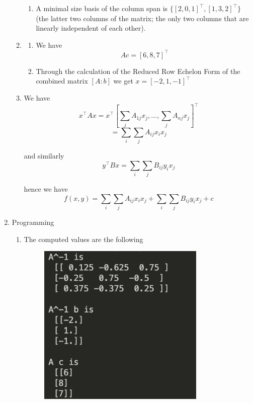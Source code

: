 \documentclass[submit]{harvardml}
\begin{document}
\begin{enumerate}
\begin{enumerate}
\begin{enumerate}
    \item
    A minimal size basis of the column span is $\{[2,0,1]^\top, [1,3,2]^\top\}$ (the latter two 
    columns of the matrix; the only two columns that are linearly independent of each other).  
  \end{enumerate}

  \item
  \begin{enumerate}
    \item
    We have $$Ac = [6,8,7]^\top$$
    
    \item
    Through the calculation of the Reduced Row Echelon Form of the combined matrix $[ A : b ]$ we 
    get $x = [-2,1,-1]^\top$
  \end{enumerate}

  \item
  We have 
  $$x^\top A x = x^\top \left[\sum_j A_{1j} x_j, ..., \sum_j A_{nj} x_j \right]^\top$$
  $$= \sum_i \sum_j A_{ij} x_i x_j$$

  and similarly 
  $$y^\top B x = \sum_i \sum_j B_{ij} y_i x_j$$

  hence we have
  $$\boxed{f(x,y) = \sum_i \sum_j A_{ij} x_i x_j + \sum_i \sum_j B_{ij} y_i x_j + c}$$
\end{enumerate}

\item Programming
\begin{enumerate}
  \item
  The computed values are the following
  \begin{figure}[h]
  \includegraphics[width=8cm]{ps0_3}
  \centering
  \end{figure}


\end{enumerate}
\end{enumerate}
\end{document}
